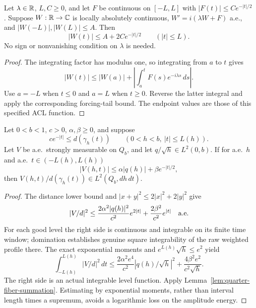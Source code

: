 \begin{lemma}
\label{lem:transport-endpoint-decay}
\leanok
Let $\lambda\in\mathbb{R}$, $L,C\ge0$, and let $F$ be continuous on $[-L,L]$
with $|F(t)|\le Ce^{-|t|/2}$.
Suppose $W:\mathbb{R}\to\mathbb{C}$ is locally absolutely continuous,
$W'=i(\lambda W+F)$ a.e., and $|W(-L)|,|W(L)|\le A$.
Then
\[
 |W(t)|\le A+2Ce^{-|t|/2}\qquad(|t|\le L).
\]
No sign or nonvanishing condition on $\lambda$ is needed.
\end{lemma}

\begin{proof}
\leanok
The integrating factor has modulus one, so integrating from $a$ to $t$
gives
\[
 |W(t)|\le |W(a)|+
 \left|\int_a^t F(s)e^{-i\lambda s}\,ds\right|.
\]
Use $a=-L$ when $t\le0$ and $a=L$ when $t\ge0$.
Reverse the latter integral and apply the corresponding forcing-tail bound.
The endpoint values are those of this specified ACL function.
\end{proof}

\begin{lemma}
\label{lem:quarter-first-mass}
\leanok
Let $0<b<1$, $c>0$, $\alpha,\beta\ge0$, and suppose
\[
 c e^{-|t|}\le d(\gamma_h(t))
 \qquad(0<h<b,\ |t|\le L(h)).
\]
Let $V$ be a.e.\ strongly measurable on $Q_b$, and let
$q/\sqrt h\in L^2(0,b)$. If for a.e.\ $h$ and a.e.\ $t\in(-L(h),L(h))$
\[
 |V(h,t)|\le\alpha|q(h)|+\beta e^{-|t|/2},
\]
then $V(h,t)/d(\gamma_h(t))\in L^2(Q_b,dh\,dt)$.
\end{lemma}

\begin{proof}
\leanok
The distance lower bound and $|x+y|^2\le2|x|^2+2|y|^2$ give
\[
 |V/d|^2
 \le \frac{2\alpha^2|q(h)|^2}{c^2}e^{2|t|}
       +\frac{2\beta^2}{c^2}e^{|t|}\quad\hbox{a.e.}
\]
For each good level the right side is continuous and integrable on its
finite time window; domination establishes genuine square integrability
of the raw weighted profile there.
The exact exponential moments and $e^{L(h)}\sqrt h\le e^2$ yield
\[
 \int_{-L(h)}^{L(h)}|V/d|^2\,dt
 \le \frac{2\alpha^2e^4}{c^2}|q(h)/\sqrt h|^2
      +\frac{4\beta^2e^2}{c^2\sqrt h}.
\]
The right side is an actual integrable level function.
Apply Lemma~\ref{lem:quarter-fiber-summation}.
Estimating by exponential moments, rather than interval length times
a supremum, avoids a logarithmic loss on the amplitude energy.
\end{proof}

